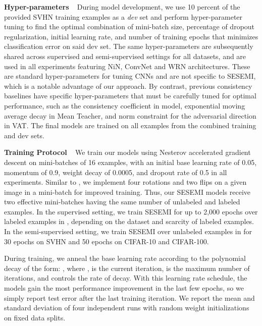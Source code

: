 \documentclass{article}
\begin{document}
\textbf{Hyper-parameters} ~ During model development, we use 10 percent of the provided SVHN training examples as a \emph{dev} set and perform hyper-parameter tuning to find the optimal combination of mini-batch size, percentage of dropout regularization, initial learning rate, and number of training epochs that minimizes classification error on said dev set. The same hyper-parameters are subsequently shared across supervised and semi-supervised settings for all datasets, and are used in all experiments featuring NiN, ConvNet and WRN architectures. These are standard hyper-parameters for tuning CNNs and are not specific to SESEMI, which is a notable advantage of our approach. By contrast, previous consistency baselines have specific hyper-parameters that must be carefully tuned for optimal performance, such as the consistency coefficient in  model, exponential moving average decay in Mean Teacher, and norm constraint  for the adversarial direction in VAT. The final models are trained on all examples from the combined training and dev sets.

\textbf{Training Protocol} ~ We train our models using Nesterov accelerated gradient descent \cite{nag} on mini-batches of 16 examples, with an initial base learning rate of 0.05, momentum of 0.9, weight decay of 0.0005, and dropout rate of 0.5 in all experiments. Similar to \cite{rotations}, we implement four rotations and two flips on a given image in a mini-batch for improved training. Thus, our SESEMI models receive two effective mini-batches having the same number of  unlabeled and labeled examples. In the supervised setting, we train SESEMI for up to 2,000 epochs over labeled examples in , depending on the dataset and scarcity of labeled examples. In the semi-supervised setting, we train SESEMI over unlabeled examples in  for 30 epochs on SVHN and 50 epochs on CIFAR-10 and CIFAR-100.

During training, we anneal the base learning rate according to the polynomial decay of the form: , where ,  is the current iteration,  is the maximum number of iterations, and  controls the rate of decay. With this learning rate schedule, the models gain the most performance improvement in the last few epochs, so we simply report test error after the last training iteration. We report the mean and standard deviation of four independent runs with random weight initializations on fixed data splits.
\end{document}
